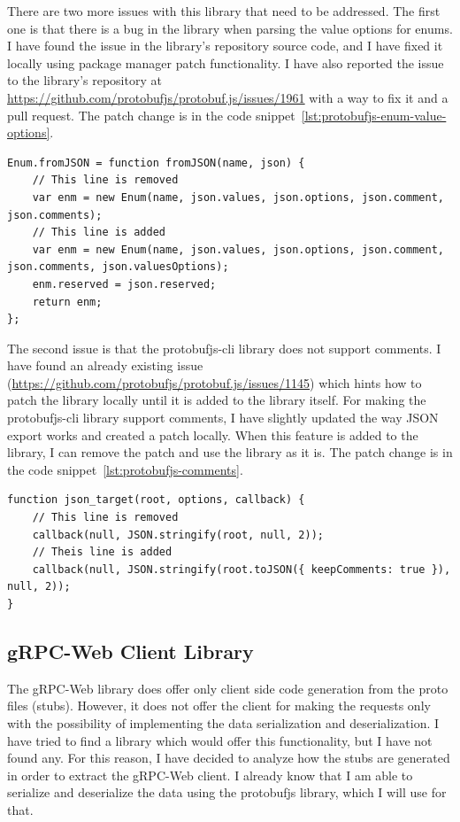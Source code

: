 There are two more issues with this library that need to be addressed.
The first one is that there is a bug in the library when parsing the value options for enums.
I have found the issue in the library's repository source code, and I have fixed it locally using package manager patch functionality.
I have also reported the issue to the library's repository at \url{https://github.com/protobufjs/protobuf.js/issues/1961} with a way to fix it and a pull request.
The patch change is in the code snippet~\ref{lst:protobufjs-enum-value-options}.

\begin{lstlisting}[style=JavaScript, caption={protobufjs library enum comments bug fix}, label={lst:protobufjs-enum-value-options}]
Enum.fromJSON = function fromJSON(name, json) {
    // This line is removed
    var enm = new Enum(name, json.values, json.options, json.comment, json.comments);
    // This line is added
    var enm = new Enum(name, json.values, json.options, json.comment, json.comments, json.valuesOptions);
    enm.reserved = json.reserved;
    return enm;
};
\end{lstlisting}

The second issue is that the protobufjs-cli library does not support comments.
I have found an already existing issue (\url{https://github.com/protobufjs/protobuf.js/issues/1145}) which hints how to patch the library locally until it is added to the library itself.
For making the protobufjs-cli library support comments, I have slightly updated the way JSON export works and created a patch locally.
When this feature is added to the library, I can remove the patch and use the library as it is.
The patch change is in the code snippet~\ref{lst:protobufjs-comments}.

\begin{lstlisting}[style=JavaScript, caption={protobufjs-cli comments support}, label={lst:protobufjs-comments}]
function json_target(root, options, callback) {
    // This line is removed
    callback(null, JSON.stringify(root, null, 2));
    // Theis line is added
    callback(null, JSON.stringify(root.toJSON({ keepComments: true }), null, 2));
}
\end{lstlisting}

\subsection{gRPC-Web Client Library}\label{subsec:grpc-web-client}
The gRPC-Web library does offer only client side code generation from the proto files (stubs).
However, it does not offer the client for making the requests only with the possibility of implementing the data serialization and deserialization.
I have tried to find a library which would offer this functionality, but I have not found any.
For this reason, I have decided to analyze how the stubs are generated in order to extract the gRPC-Web client.
I already know that I am able to serialize and deserialize the data using the protobufjs library, which I will use for that.

